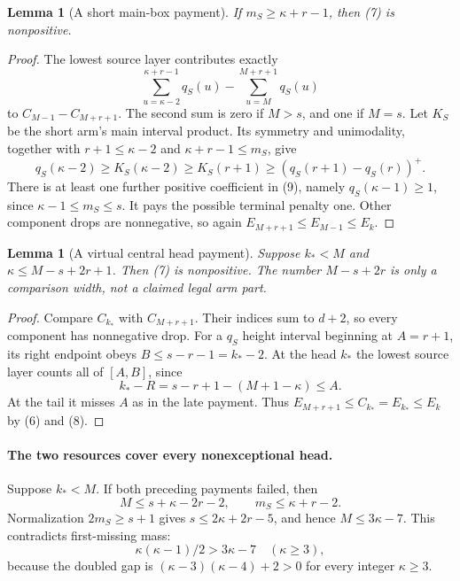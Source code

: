 \documentclass[11pt]{article}
\newtheorem{lemma}[proposition]{Lemma}
\begin{document}
\begin{lemma}[A short main-box payment]
If $m_S\ge\kappa+r-1$, then (7) is nonpositive.
\end{lemma}
\begin{proof}
The lowest source layer contributes exactly
\[
 \sum_{u=\kappa-2}^{\kappa+r-1}q_S(u)
                  -\sum_{u=M}^{M+r+1}q_S(u)             \tag{9}
\]
to $C_{M-1}-C_{M+r+1}$. The second sum is zero if $M>s$, and one if
$M=s$. Let $K_S$ be the short arm's main interval product. Its symmetry
and unimodality, together with $r+1\le\kappa-2$ and
$\kappa+r-1\le m_S$, give
\[
 q_S(\kappa-2)\ge K_S(\kappa-2)\ge K_S(r+1)
                         \ge(q_S(r+1)-q_S(r))^+.
\]
There is at least one further positive coefficient in (9), namely
$q_S(\kappa-1)\ge1$, since $\kappa-1\le m_S\le s$.
It pays the possible terminal penalty one. Other component drops are
nonnegative, so again $E_{M+r+1}\le E_{M-1}\le E_k$.
\end{proof}

\begin{lemma}[A virtual central head payment]
Suppose $k_*<M$ and $\kappa\le M-s+2r+1$. Then (7) is nonpositive.
The number $M-s+2r$ is only a comparison width, not a claimed legal arm part.
\end{lemma}
\begin{proof}
Compare $C_{k_*}$ with $C_{M+r+1}$. Their indices sum to $d+2$,
so every component has nonnegative drop. For a $q_S$ height interval
beginning at $A=r+1$, its right endpoint obeys
$B\le s-r-1=k_*-2$. At the head $k_*$ the lowest source layer counts
all of $[A,B]$, since
\[
                   k_*-R=s-r+1-(M+1-\kappa)\le A.
\]
At the tail it misses $A$ as in the late payment.
Thus $E_{M+r+1}\le C_{k_*}=E_{k_*}\le E_k$ by (6) and (8).
\end{proof}

\paragraph{The two resources cover every nonexceptional head.}
Suppose $k_*<M$. If both preceding payments failed, then
\[
 M\le s+\kappa-2r-2,\qquad m_S\le\kappa+r-2.
\]
Normalization $2m_S\ge s+1$ gives $s\le2\kappa+2r-5$, and hence
$M\le3\kappa-7$. This contradicts first-missing mass:
\[
 \kappa(\kappa-1)/2>3\kappa-7
       \quad(\kappa\ge3),
\]
because the doubled gap is
$(\kappa-3)(\kappa-4)+2>0$ for every integer $\kappa\ge3$.
\end{document}
